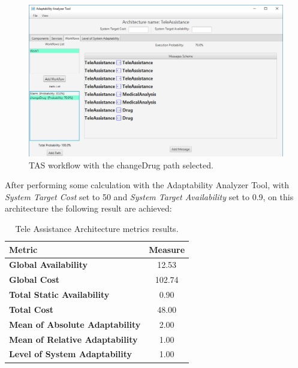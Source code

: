 \begin{figure}[ht]
	\centerline
	{\includegraphics[scale=0.55]{img/TeleAssistancePath2.png}}
	\caption[TAS Workflow Path changeDrug]{TAS workflow with the changeDrug path selected.}
	\label{fig:tas-path2}
\end{figure}

\clearpage

After performing some calculation with the Adaptability Analyzer Tool, with \emph{System Target Cost} set to 50 and \emph{System Target Availability} set to 0.9, on this architecture the following result are achieved:

\begin{table}[ht!b]
	\centering
	\begin{tabular}{|l|c|}
		\hline
		Metric & Measure \\
		\hline 
		\textbf{Global Availability} & 12.53 \\ 
		\hline 
		\textbf{Global Cost} & 102.74 \\
		\hline 
		\textbf{Total Static Availability} & 0.90 \\
		\hline 
		\textbf{Total Cost} & 48.00 \\
		\hline 
		\textbf{Mean of Absolute Adaptability} & 2.00 \\
		\hline
		\textbf{Mean of Relative Adaptability} & 1.00 \\
		\hline
		\textbf{Level of System Adaptability} & 1.00 \\
		\hline
	\end{tabular} 
	\caption[TAS Service Architecture Metrics]{Tele Assistance Architecture metrics results.}
	\label{tab:tas-arch-res}
\end{table}

